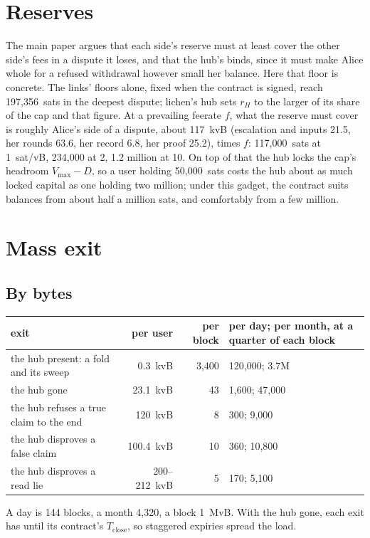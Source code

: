 \documentclass[11pt]{article}
\newcommand{\vmax}{V_{\max}}
\newcommand{\Tc}{T_{\mathrm{close}}}
\begin{document}
\section{Reserves}
\label{sec:reserves}

The main paper argues that each side's reserve must at least cover the
other side's fees in a dispute it loses, and that the hub's binds,
since it must make Alice whole for a refused withdrawal however small
her balance. Here that floor is concrete. The links' floors alone,
fixed when the contract is signed, reach 197,356~sats in the deepest
dispute; lichen's hub sets $r_H$ to the larger of its share of the cap
and that figure. At a prevailing feerate $f$, what the reserve must cover
is roughly Alice's side of a dispute, about 117~kvB (escalation and
inputs 21.5, her rounds 63.6, her record 6.8, her proof 25.2), times
$f$: 117,000~sats at 1~sat/vB, 234,000 at 2, 1.2 million at 10. On top
of that the hub locks the cap's headroom $\vmax - D$, so a user holding
50,000~sats costs the hub about as much locked capital as one holding
two million; under this gadget, the contract suits balances from about
half a million sats, and comfortably from a few million.

\section{Mass exit}
\label{sec:exit}

\subsection{By bytes}

\begin{center}
\small
\begin{tabularx}{\linewidth}{>{\raggedright\arraybackslash}p{58mm}rrL}
\toprule
exit & per user & per block & per day; per month, at a quarter of each block \\
\midrule
the hub present: a fold and its sweep & 0.3~kvB & 3,400 & 120,000; 3.7M \\
the hub gone & 23.1~kvB & 43 & 1,600; 47,000 \\
the hub refuses a true claim to the end & 120~kvB & 8 & 300; 9,000 \\
the hub disproves a false claim & 100.4~kvB & 10 & 360; 10,800 \\
the hub disproves a read lie & 200--212~kvB & 5 & 170; 5,100 \\
\bottomrule
\end{tabularx}
\end{center}
A day is 144 blocks, a month 4,320, a block 1~MvB. With the hub gone,
each exit has until its contract's $\Tc$, so staggered expiries spread
the load.
\end{document}
